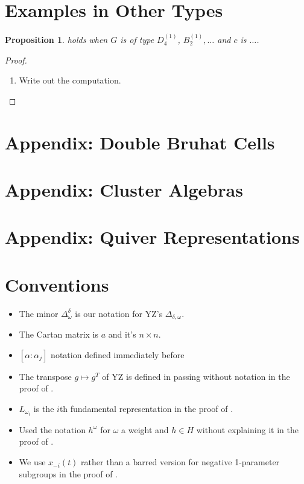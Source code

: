 \documentclass[11pt]{amsart}
\newtheorem{proposition}[theorem]{Proposition}
\begin{document}
\section{Examples in Other Types}

\begin{proposition}
 holds when $G$ is of type $D_4^{(1)}$, $B_2^{(1)},\dotsc$ and $c$ is $\dotsc$. 
\end{proposition}
\begin{proof}
\begin{enumerate}
\item Write out the computation.
\end{enumerate}
\end{proof}

\section{Appendix: Double Bruhat Cells}
\section{Appendix: Cluster Algebras}
\section{Appendix: Quiver Representations}

\section{Conventions}

\begin{itemize}
\item The minor $\Delta_\omega^\delta$ is our notation for YZ's $\Delta_{\delta, \omega}$.
\item The Cartan matrix is $a$ and it's $n \times n$.
\item $[\alpha:\alpha_j]$ notation defined immediately before 
\item The transpose $g \mapsto g^T$ of YZ is defined in passing without notation in the proof of .
\item $L_{\omega_i}$ is the $i$th fundamental representation in the proof of .
\item Used the notation $h^\omega$ for $\omega$ a weight and $h \in H$ without explaining it in the proof of .
\item We use $x_{-i}(t)$ rather than a barred version for negative 1-parameter subgroups in the proof of .
\end{itemize}
\end{document}

